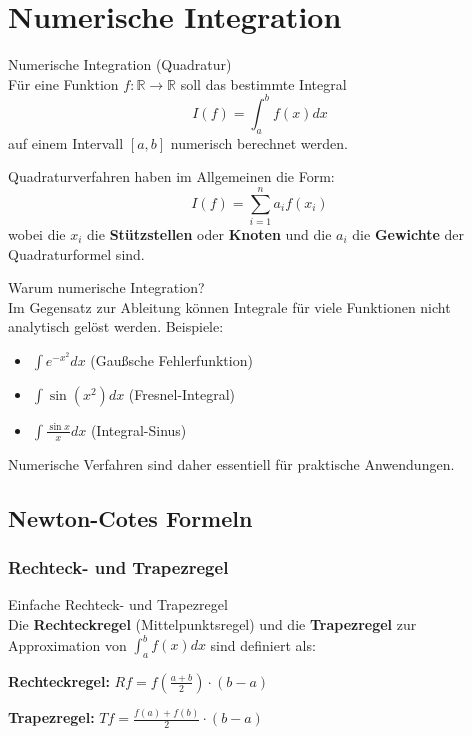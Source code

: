 \section{Numerische Integration}

\begin{definition}{Numerische Integration (Quadratur)}\\
Für eine Funktion $f: \mathbb{R} \rightarrow \mathbb{R}$ soll das bestimmte Integral
$$I(f) = \int_a^b f(x) dx$$
auf einem Intervall $[a,b]$ numerisch berechnet werden.

Quadraturverfahren haben im Allgemeinen die Form:
$$I(f) = \sum_{i=1}^{n} a_i f(x_i)$$
wobei die $x_i$ die \textbf{Stützstellen} oder \textbf{Knoten} und die $a_i$ die \textbf{Gewichte} der Quadraturformel sind.
\end{definition}

\begin{concept}{Warum numerische Integration?}\\
Im Gegensatz zur Ableitung können Integrale für viele Funktionen nicht analytisch gelöst werden. Beispiele:
\begin{itemize}
    \item $\int e^{-x^2} dx$ (Gaußsche Fehlerfunktion)
    \item $\int \sin(x^2) dx$ (Fresnel-Integral)
    \item $\int \frac{\sin x}{x} dx$ (Integral-Sinus)
\end{itemize}
Numerische Verfahren sind daher essentiell für praktische Anwendungen.
\end{concept}

\subsection{Newton-Cotes Formeln}

\subsubsection{Rechteck- und Trapezregel}

\begin{definition}{Einfache Rechteck- und Trapezregel}\\
Die \textbf{Rechteckregel} (Mittelpunktsregel) und die \textbf{Trapezregel} zur Approximation von $\int_a^b f(x) dx$ sind definiert als:

\textbf{Rechteckregel:} $Rf = f\left(\frac{a+b}{2}\right) \cdot (b-a)$

\textbf{Trapezregel:} $Tf = \frac{f(a) + f(b)}{2} \cdot (b-a)$
\end{definition}

